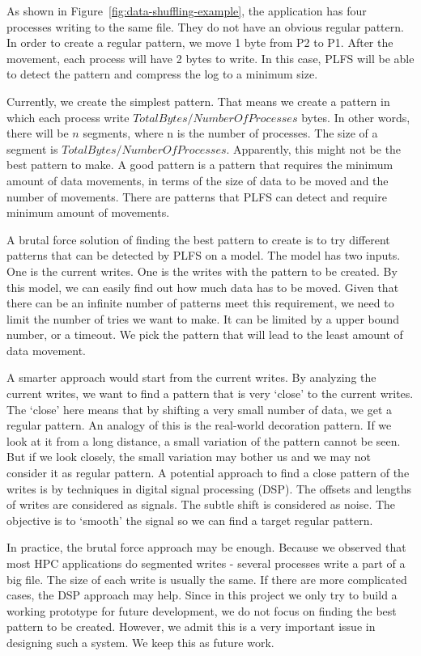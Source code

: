 \documentclass{acm_proc_article-sp}
\begin{document}
As shown in Figure~\ref{fig:data-shuffling-example},
the application has four processes writing to 
the same file. They do not have an obvious regular
pattern. In order to create a regular pattern,
we move 1 byte from P2 to P1. After the movement, 
each process will have 2 bytes to write. In this
case, PLFS will be able to detect the pattern
and compress the log to a minimum size.

Currently, we create the simplest pattern.
That means we create a pattern in which
each process write $TotalBytes/NumberOfProcesses$ bytes.
In other words, there will be $n$ segments,
where n is the number of processes. 
The size of a segment is $TotalBytes/NumberOfProcesses$.
Apparently, this might not be the best pattern to make.
A good pattern is a pattern that requires
the minimum amount of data movements, in terms
of the size of data to be moved and the number
of movements. There are patterns that 
PLFS can detect and require minimum amount
of movements.

A brutal force solution of finding the best
pattern to create is to try different patterns
that can be detected by PLFS on a model.
The model has two inputs. One is the current
writes. One is the writes with the pattern
to be created. By this model, we can easily
find out how much data has to be moved.
Given that
there can be an infinite number of patterns
meet this requirement, we need to limit
the number of tries we want to make. It
can be limited by a upper bound number, or 
a timeout. We pick the pattern that will
lead to the least amount of data movement.

A smarter approach would start from
the current writes. By analyzing the 
current writes, we want to find a pattern
that is very `close' to the current writes.
The `close' here means that by shifting
a very small number of data, we get a 
regular pattern. An analogy of this is
the real-world decoration pattern. If
we look at it from a long distance, 
a small variation of the pattern
cannot be seen. But if we look closely,
the small variation may bother us
and we may not consider it as regular 
pattern. A potential approach to 
find a close pattern of the writes
is by techniques in digital signal processing (DSP).
The offsets and lengths of writes are 
considered as signals.
The subtle shift is considered as noise.
The objective is to `smooth' the signal
so we can find a target regular pattern.

In practice, the brutal force approach
may be enough. Because we observed that 
most HPC applications do segmented writes
- several processes write a part of a big
file. The size of each write is usually
the same. If there are more complicated
cases, the DSP approach may help. 
Since in this project we only try to build
a working prototype for future development,
we do not focus on finding the best pattern
to be created. However, we admit this is
a very important issue in designing such a
system. We keep this as future work.
\end{document}
